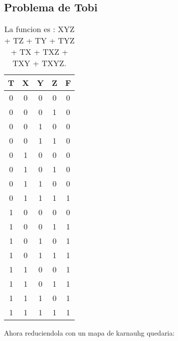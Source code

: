 \documentclass{article}
\begin{document}
\subsection{Problema de Tobi}
\begin{table}[H]
  \centering
    \begin{tabular}{| c | c | c | c | c |}
      \hline \cellcolor{gray!25}T & \cellcolor{gray!25}X & \cellcolor{gray!25}Y & \cellcolor{gray!25}Z & \cellcolor{gray!25}F \\ \hline
      0 & 0 & 0 & 0 & \cellcolor{blue!10}0\\ \hline
      0 & 0 & 0 & 1 & \cellcolor{blue!10}0\\ \hline
      0 & 0 & 1 & 0 & \cellcolor{blue!10}0\\ \hline
      0 & 0 & 1 & 1 & \cellcolor{blue!10}0\\ \hline
      0 & 1 & 0 & 0 & \cellcolor{blue!10}0\\ \hline
      0 & 1 & 0 & 1 & \cellcolor{blue!10}0\\ \hline
      0 & 1 & 1 & 0 & \cellcolor{blue!10}0\\ \hline
      0 & 1 & 1 & 1 & \cellcolor{blue!25}1\\ \hline
      1 & 0 & 0 & 0 & \cellcolor{blue!10}0\\ \hline
      1 & 0 & 0 & 1 & \cellcolor{blue!25}1\\ \hline
      1 & 0 & 1 & 0 & \cellcolor{blue!25}1\\ \hline
      1 & 0 & 1 & 1 & \cellcolor{blue!25}1\\ \hline
      1 & 1 & 0 & 0 & \cellcolor{blue!25}1\\ \hline
      1 & 1 & 0 & 1 & \cellcolor{blue!25}1\\ \hline
      1 & 1 & 1 & 0 & \cellcolor{blue!25}1\\ \hline
      1 & 1 & 1 & 1 & \cellcolor{blue!25}1\\ \hline
    \end{tabular}
  \caption{La funcion es : XYZ + TZ + TY + TYZ + TX + TXZ + TXY + TXYZ.}
\end{table}

Ahora reduciendola con un mapa de karnauhg quedaria:
\end{document}
